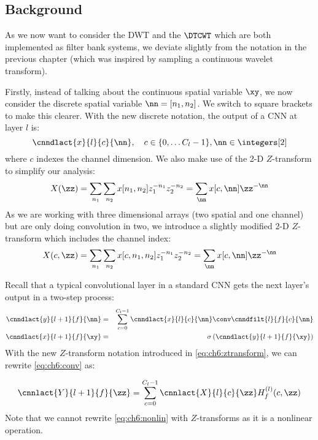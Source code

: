 \subsection{Background}
As we now want to consider the DWT and the $\DTCWT$ which are both implemented
as filter bank systems, we deviate slightly from the notation in the previous
chapter (which was inspired by sampling a continuous wavelet transform). 

Firstly, instead of talking about the continuous spatial variable $\xy$, we now
consider the discrete spatial variable $\nn = [n_1, n_2]$. We switch to square 
brackets to make this clearer. With the new discrete notation, the output of a CNN at layer $l$ is:
%
\begin{equation}
  \cnndlact{x}{l}{c}{\nn}, \quad c\in \{0, \ldots C_l-1\}, \nn \in \integers[2]
\end{equation}
%
where $c$ indexes the channel dimension. 
We also make use of the 2-D $Z$-transform to simplify our analysis:
%
\begin{equation}
  X(\zz) = \sum_{n_1}\sum_{n_2} x[n_1, n_2]z_1^{-n_1}z_2^{-n_2} =
  \sum_{\nn}x[c, \nn]\zz^{-\nn}
\end{equation}
%
As we are working with three dimensional arrays (two spatial and one channel) but are
only doing convolution in two, we introduce a slightly modified 2-D $Z$-transform
which includes the channel index:
%
\begin{equation}
  X(c, \zz) = \sum_{n_1}\sum_{n_2} x[c, n_1, n_2]z_1^{-n_1}z_2^{-n_2} =
  \sum_{\nn}x[c, \nn]\zz^{-\nn} \label{eq:ch6:ztransform}
\end{equation}

Recall that a typical convolutional
layer in a standard CNN gets the next layer's output in a two-step process:
%
\begin{eqnarray} 
  \cnndlact{y}{l+1}{f}{\nn} &=& \sum_{c=0}^{C_l - 1} \cnndlact{x}{l}{c}{\nn} \conv \cnndfilt{l}{f}{c}{\nn}
    \label{eq:ch6:conv}\\
    \cnndlact{x}{l+1}{f}{\xy} & = & \sigma \left( \cnndlact{y}{l+1}{f}{\xy} \right) \label{eq:ch6:nonlin}
\end{eqnarray}
%
With the new $Z$-transform notation introduced in \eqref{eq:ch6:ztransform}, we
can rewrite \eqref{eq:ch6:conv} as:

\begin{equation}
  \cnnlact{Y}{l+1}{f}{\zz} = \sum_{c=0}^{C_l - 1} \cnnlact{X}{l}{c}{\zz}
  H_f^{(l)}(c, \zz)
\end{equation}
%
Note that we cannot rewrite \eqref{eq:ch6:nonlin} with $Z$-transforms as it is a nonlinear
operation.

